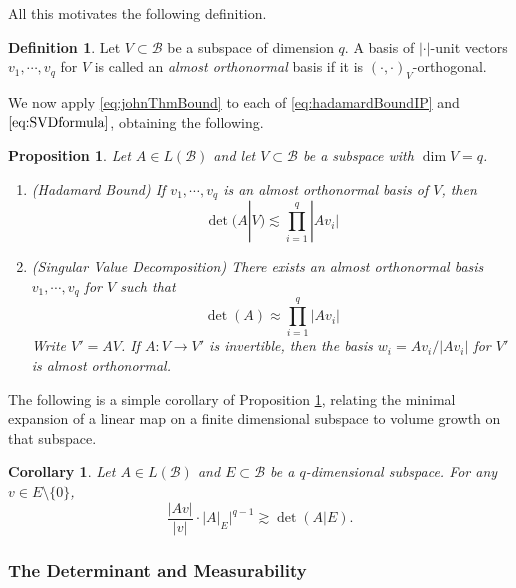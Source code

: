 \documentclass[11pt]{amsart}
\theoremstyle{theorem}
\newtheorem{cor}[thm]{Corollary}
\newtheorem{prop}[thm]{Proposition}
\theoremstyle{definition}
\newtheorem{defn}[thm]{Definition}
\numberwithin{equation}{section}
\newcommand{\Bc}{\mathcal{B}}
\begin{document}
All this motivates the following definition.
\begin{defn}
Let $V \subset \Bc$ be a subspace of dimension $q$. A basis of $|\cdot|$-unit vectors $v_1, \cdots, v_q$ for $V$ is called an \emph{almost orthonormal}
basis if it is $(\cdot, \cdot)_V$-orthogonal.
\end{defn}

We now apply \eqref{eq:johnThmBound} to each of \eqref{eq:hadamardBoundIP} and $\eqref{eq:SVDformula}$, obtaining the following.

\begin{prop}\label{prop:approxSVD}
Let $A  \in L(\Bc)$ and let $V \subset \Bc$ be a subspace with $\dim V = q$.  

\begin{enumerate}
\item (Hadamard Bound) If $v_1, \cdots, v_q$ is an almost orthonormal basis of $V$, then
\[
\det(A|V) \lesssim  \prod_{i = 1}^q |A v_i|
\]

\item (Singular Value Decomposition) There exists an almost orthonormal basis $v_1, \cdots, v_q$ for $V$ such that
\[
 \det(A) \approx \prod_{i = 1}^q |A v_i| 
\]
Write $V' = A V$. If $A : V \to V'$ is invertible, then the basis $w_i = A v_i / |A v_i|$ for $V'$ is almost orthonormal.
\end{enumerate}
\end{prop}

The following is a simple corollary of Proposition \ref{prop:approxSVD}, relating the minimal expansion of a linear map on a finite dimensional subspace to volume growth on that subspace. 

\begin{cor} \label{cor:minExpand}
Let $A \in L(\Bc)$ and $E \subset \Bc$ be a $q$-dimensional subspace. For any $v \in E \setminus \{0\}$,
\[
\frac{|Av|}{|v|} \cdot |A|_E|^{q-1} \gtrsim \det(A|E).
\]
\end{cor}









\subsubsection{The Determinant and Measurability}
\end{document}
